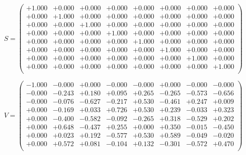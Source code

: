 \documentclass[9pt]{article}
\theoremstyle{plain}
\theoremstyle{definition}
\theoremstyle{remark}
\numberwithin{equation}{section}
\begin{document}
$S = \left(
\begin{array}{
cccccccc}
+1.000 & +0.000 & +0.000 & +0.000 & +0.000 & +0.000 & +0.000 & +0.000 \\
+0.000 & +1.000 & +0.000 & +0.000 & +0.000 & +0.000 & +0.000 & +0.000 \\
+0.000 & +0.000 & +1.000 & +0.000 & +0.000 & +0.000 & +0.000 & +0.000 \\
+0.000 & +0.000 & +0.000 & +1.000 & +0.000 & +0.000 & +0.000 & +0.000 \\
+0.000 & +0.000 & +0.000 & +0.000 & +1.000 & +0.000 & +0.000 & +0.000 \\
+0.000 & +0.000 & +0.000 & +0.000 & +0.000 & +1.000 & +0.000 & +0.000 \\
+0.000 & +0.000 & +0.000 & +0.000 & +0.000 & +0.000 & +1.000 & +0.000 \\
+0.000 & +0.000 & +0.000 & +0.000 & +0.000 & +0.000 & +0.000 & +1.000 \\
\end{array}
\right)$ \newline 

$V = \left(
\begin{array}{
cccccccc}
-1.000 & -0.000 & +0.000 & -0.000 & -0.000 & +0.000 & -0.000 & -0.000 \\
-0.000 & -0.243 & +0.180 & +0.095 & +0.265 & -0.265 & -0.573 & -0.656 \\
-0.000 & -0.076 & -0.627 & -0.217 & +0.530 & -0.461 & +0.247 & +0.009 \\
+0.000 & -0.169 & +0.033 & +0.726 & +0.530 & +0.239 & -0.033 & +0.323 \\
+0.000 & -0.400 & -0.582 & -0.092 & -0.265 & +0.318 & -0.529 & +0.202 \\
+0.000 & +0.648 & -0.437 & +0.255 & +0.000 & +0.350 & -0.015 & -0.450 \\
+0.000 & +0.023 & +0.192 & -0.577 & +0.530 & +0.589 & -0.049 & -0.020 \\
+0.000 & +0.572 & +0.081 & -0.104 & +0.132 & -0.301 & -0.572 & +0.470 \\
\end{array}
\right)$ \newline 
\end{document}
